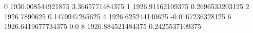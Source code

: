 0 1930.008544921875 3.3665771484375
1 1926.91162109375 0.2696533203125
2 1926.7890625 0.1470947265625
4 1926.625244140625 -0.0167236328125
6 1926.6419677734375 0.0
8 1926.884521484375 0.2425537109375
